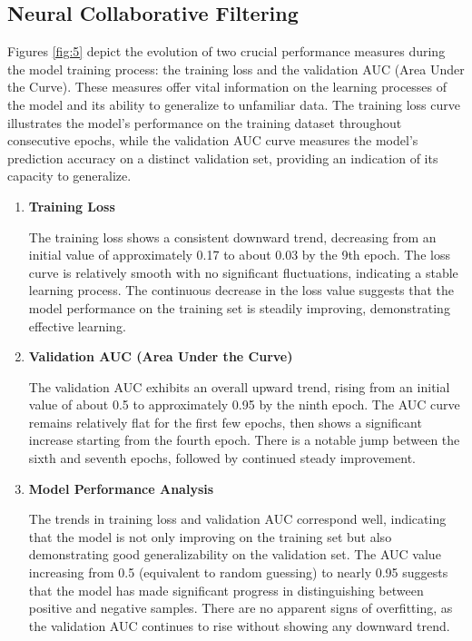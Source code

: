 \documentclass[9pt,twocolumn,twoside,lineno]{gsajnl}
\begin{document}
\subsection{Neural Collaborative Filtering}
Figures \ref{fig:5} depict the evolution of two crucial performance measures during the model training process: the training loss and the validation AUC (Area Under the Curve). These measures offer vital information on the learning processes of the model and its ability to generalize to unfamiliar data. The training loss curve illustrates the model's performance on the training dataset throughout consecutive epochs, while the validation AUC curve measures the model's prediction accuracy on a distinct validation set, providing an indication of its capacity to generalize.

\begin{enumerate}
\item \textbf{Training Loss\newline}

The training loss shows a consistent downward trend, decreasing from an initial value of approximately 0.17 to about 0.03 by the 9th epoch.
The loss curve is relatively smooth with no significant fluctuations, indicating a stable learning process.
The continuous decrease in the loss value suggests that the model performance on the training set is steadily improving, demonstrating effective learning.


\item \textbf{Validation AUC (Area Under the Curve)\newline}

The validation AUC exhibits an overall upward trend, rising from an initial value of about 0.5 to approximately 0.95 by the ninth epoch.
The AUC curve remains relatively flat for the first few epochs, then shows a significant increase starting from the fourth epoch.
There is a notable jump between the sixth and seventh epochs, followed by continued steady improvement.


\item \textbf{Model Performance Analysis\newline}

The trends in training loss and validation AUC correspond well, indicating that the model is not only improving on the training set but also demonstrating good generalizability on the validation set.
The AUC value increasing from 0.5 (equivalent to random guessing) to nearly 0.95 suggests that the model has made significant progress in distinguishing between positive and negative samples.
There are no apparent signs of overfitting, as the validation AUC continues to rise without showing any downward trend.



\end{enumerate}
\end{document}
